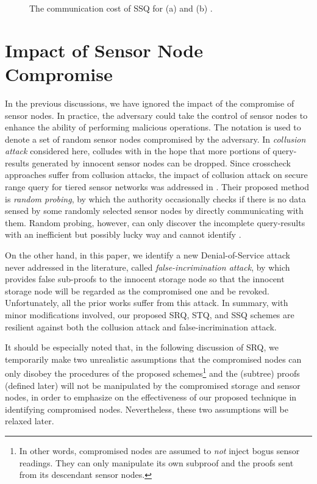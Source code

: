 \documentclass[conference]{IEEEtran}
\begin{document}
\begin{figure}[h]
\centering
{}
\caption{\scriptsize The communication cost of SSQ for (a)  and (b) .} \label{fig: SSQ communication cost}
\end{figure}

\section{Impact of Sensor Node Compromise}\label{sec: Impact of Sensor Node Compromise}
In the previous discussions, we have ignored the impact of the compromise of sensor nodes. In practice, the adversary could take the control of sensor nodes to enhance the ability of performing malicious operations. The notation  is used to denote a set of random sensor nodes compromised by the adversary. In \emph{collusion attack} considered here,  colludes with  in the hope that more portions of query-results generated by innocent sensor nodes can be dropped. Since crosscheck approaches \cite{zsz09} suffer from collusion attacks, the impact of collusion attack on secure range query for tiered sensor networks was addressed in \cite{zsz09}. Their proposed method is \emph{random probing}, by which the authority occasionally checks if there is no data sensed by some randomly selected sensor nodes by directly communicating with them. Random probing, however, can only discover the incomplete query-results with an inefficient but possibly lucky way and cannot identify .

On the other hand, in this paper, we identify a new Denial-of-Service attack never addressed in the literature, called \emph{false-incrimination attack}, by which  provides false sub-proofs to the innocent storage node so that the innocent storage node will be regarded as the compromised one and be revoked. Unfortunately, all the prior works \cite{sl08,szz09,zsz09} suffer from this attack. In summary, with minor modifications involved, our proposed SRQ, STQ, and SSQ schemes are resilient against both the collusion attack and false-incrimination attack.

It should be especially noted that, in the following discussion of SRQ, we temporarily make two unrealistic assumptions that the compromised nodes can only disobey the procedures of the proposed schemes\footnote{In other words, compromised nodes are assumed to \emph{not} inject bogus sensor readings. They can only manipulate its own subproof and the proofs sent from its descendant sensor nodes.} and the (subtree) proofs (defined later) will not be manipulated by the compromised storage and sensor nodes, in order to emphasize on the effectiveness of our proposed technique in identifying compromised nodes. Nevertheless, these two assumptions will be relaxed later.
\end{document}
